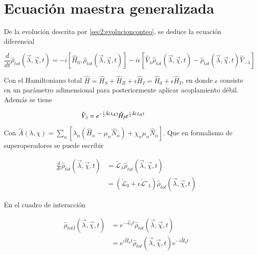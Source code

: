 \label{sec2:superop}

\newpage

\section{Ecuación maestra generalizada}
De la evolución descrita por \ref{sec2:evolucionconteo}, se deduce la ecuación diferencial

\begin{equation*}
    \frac{d}{dt}\hat{\rho}_{tot}(\vec{\lambda},\vec{\chi},t) = -i[\hat{H}_{0},\hat{\rho}_{tot}(\vec{\lambda},\vec{\chi},t)] - i\epsilon[\hat{V}_{\lambda} \hat{\rho}_{tot}(\vec{\lambda},\vec{\chi},t) - \hat{\rho}_{tot}(\vec{\lambda},\vec{\chi},t)\hat{V}_{-\lambda}]
\end{equation*}

Con el Hamiltoniano total $\hat{H} = \hat{H}_{S} + \hat{H}_{B} + \epsilon \hat{H}_{I} = \hat{H}_{0} + \epsilon \hat{H}_{I}$, en donde $\epsilon$ consiste en un parámetro adimensional para posteriormente aplicar acoplamiento débil. Además se tiene

\begin{equation*}
    \hat{V}_{\lambda} = e^{-\frac{i}{2}\hat{A}(\lambda,\chi)}\hat{H}_{I}e^{\frac{i}{2}\hat{A}(\lambda,\chi)} \hspace{14mm}  
\end{equation*}

Con $\hat{A}(\lambda,\chi) = \sum_{\alpha}[\lambda_{\alpha}(\hat{H}_{\alpha} - \mu_{\alpha}\hat{N}_{\alpha}) + \chi_{\alpha}\mu_{\alpha}\hat{N}_{\alpha} ]$. Que en formalismo de superoperadores se puede escribir

\begin{align*}
    \frac{d}{dt}\hat{\rho}_{tot}(\vec{\lambda},\vec{\chi},t) & = \check{\mathcal{L}}_{\lambda}\hat{\rho}_{tot}(\vec{\lambda},\vec{\chi},t) \\  
        & = (\check{\mathcal{L}}_{0} + \epsilon \check{\mathcal{L}}'_{\lambda} )\hat{\rho}_{tot}(\vec{\lambda},\vec{\chi},t) 
\end{align*}

En el cuadro de interacción 

\begin{align*}
    \hat{\rho}_{totI}(\vec{\lambda},\vec{\chi},t) & = e^{-\check{\mathcal{L}_{0}}t}\hat{\rho}_{tot}(\vec{\lambda},\vec{\chi},t) \\
    & = e^{i\hat{H}_{0}t}\hat{\rho}_{tot}(\vec{\lambda},\vec{\chi},t)e^{-i\hat{H}_{0}t}
\end{align*}

